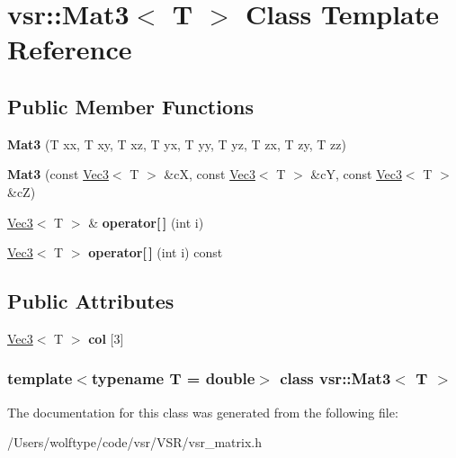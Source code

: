 \hypertarget{classvsr_1_1_mat3}{\section{vsr\-:\-:Mat3$<$ T $>$ Class Template Reference}
\label{classvsr_1_1_mat3}
}
\subsection*{Public Member Functions}
\begin{DoxyCompactItemize}
\item 
\hypertarget{classvsr_1_1_mat3_a0d9f58c2c963b65695f6579c55ec6576}{{\bfseries Mat3} (T xx, T xy, T xz, T yx, T yy, T yz, T zx, T zy, T zz)}\label{classvsr_1_1_mat3_a0d9f58c2c963b65695f6579c55ec6576}

\item 
\hypertarget{classvsr_1_1_mat3_ab1d73ca641b4f2d25ef8d175c5ad521a}{{\bfseries Mat3} (const \hyperlink{classvsr_1_1_vec3}{Vec3}$<$ T $>$ \&c\-X, const \hyperlink{classvsr_1_1_vec3}{Vec3}$<$ T $>$ \&c\-Y, const \hyperlink{classvsr_1_1_vec3}{Vec3}$<$ T $>$ \&c\-Z)}\label{classvsr_1_1_mat3_ab1d73ca641b4f2d25ef8d175c5ad521a}

\item 
\hypertarget{classvsr_1_1_mat3_a72c3fc677203f81724e218a1c853a776}{\hyperlink{classvsr_1_1_vec3}{Vec3}$<$ T $>$ \& {\bfseries operator\mbox{[}$\,$\mbox{]}} (int i)}\label{classvsr_1_1_mat3_a72c3fc677203f81724e218a1c853a776}

\item 
\hypertarget{classvsr_1_1_mat3_af60abef0dcbcd3415a5f49a58a120470}{\hyperlink{classvsr_1_1_vec3}{Vec3}$<$ T $>$ {\bfseries operator\mbox{[}$\,$\mbox{]}} (int i) const }\label{classvsr_1_1_mat3_af60abef0dcbcd3415a5f49a58a120470}

\end{DoxyCompactItemize}
\subsection*{Public Attributes}
\begin{DoxyCompactItemize}
\item 
\hypertarget{classvsr_1_1_mat3_afbdc21d37e34cc9ae54de0d143128495}{\hyperlink{classvsr_1_1_vec3}{Vec3}$<$ T $>$ {\bfseries col} \mbox{[}3\mbox{]}}\label{classvsr_1_1_mat3_afbdc21d37e34cc9ae54de0d143128495}

\end{DoxyCompactItemize}
\subsubsection*{template$<$typename T = double$>$ class vsr\-::\-Mat3$<$ T $>$}



The documentation for this class was generated from the following file\-:\begin{DoxyCompactItemize}
\item 
/\-Users/wolftype/code/vsr/\-V\-S\-R/vsr\-\_\-matrix.\-h\end{DoxyCompactItemize}
